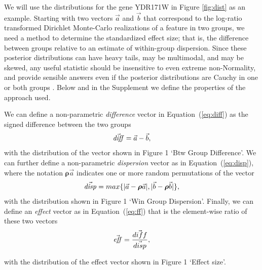 \documentclass[fleqn,10pt,lineno]{wlpeerj}
\begin{document}
We will use the distributions for the gene YDR171W in Figure \ref{fig:dist} as an example. Starting with two vectors $\vec{a}$ and $\vec{b}$  that correspond to the log-ratio transformed Dirichlet Monte-Carlo realizations of a feature in two groups, we need a method to determine the standardized effect size;  that is, the difference between groups relative to an estimate of within-group dispersion. Since these posterior distributions can have heavy tails, may be multimodal, and may be skewed, any useful statistic should be insensitive to even extreme non-Normality, and  provide sensible answers even if the posterior  distributions are  Cauchy in one or both groups \citep{fernandes:2013}. Below and in the Supplement we define the properties of the approach used.

We can define a non-parametric  \emph{difference} vector  in Equation~(\ref{eq:diff}) as the signed difference between the two groups
\begin{equation}
\vec{\mathit{diff}} = \vec{a} - \vec{b},
\label{eq:diff}\vspace*{-10pt}
\end{equation}
with the distribution of the vector  shown in Figure 1 `Btw Group Difference'.  We can further define a non-parametric  \emph{dispersion} vector as in Equation~(\ref{eq:disp}), where the notation $\boldsymbol{\rho}\vec{a}$ indicates one or more random permutations of the vector
\begin{equation}
\vec{\mathit{disp}} = max \{ \lvert \vec{a} - \boldsymbol{\rho} \vec{a}  \rvert ,\lvert \vec{b} -\boldsymbol{\rho} \vec{b} \rvert \},
\label{eq:disp}\vspace*{-10pt}
\end{equation}
with the distribution shown in Figure 1 `Win Group Dispersion'. Finally, we can define an \emph{effect} vector as in Equation~(\ref{eq:ff}) that is the element-wise ratio of these two vectors 
\begin{equation}
\vec{\mathit{eff}} = \frac{\vec{diff}}{\vec{disp}},
\label{eq:ff}\vspace*{0pt}
\end{equation}

with the distribution of the effect vector shown in Figure 1 `Effect size'.
\end{document}
